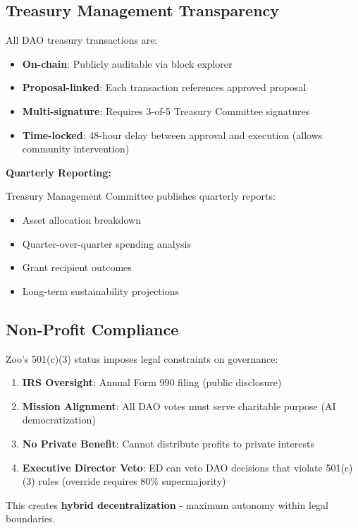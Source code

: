 \documentclass[11pt,letterpaper]{article}
\theoremstyle{definition}
\theoremstyle{remark}
\begin{document}
\subsection{Treasury Management Transparency}

All DAO treasury transactions are:
\begin{itemize}
\item \textbf{On-chain}: Publicly auditable via block explorer
\item \textbf{Proposal-linked}: Each transaction references approved proposal
\item \textbf{Multi-signature}: Requires 3-of-5 Treasury Committee signatures
\item \textbf{Time-locked}: 48-hour delay between approval and execution (allows community intervention)
\end{itemize}

\textbf{Quarterly Reporting:}

Treasury Management Committee publishes quarterly reports:
\begin{itemize}
\item Asset allocation breakdown
\item Quarter-over-quarter spending analysis
\item Grant recipient outcomes
\item Long-term sustainability projections
\end{itemize}

\subsection{Non-Profit Compliance}

Zoo's 501(c)(3) status imposes legal constraints on governance:

\begin{enumerate}
\item \textbf{IRS Oversight}: Annual Form 990 filing (public disclosure)
\item \textbf{Mission Alignment}: All DAO votes must serve charitable purpose (AI democratization)
\item \textbf{No Private Benefit}: Cannot distribute profits to private interests
\item \textbf{Executive Director Veto}: ED can veto DAO decisions that violate 501(c)(3) rules (override requires 80\% supermajority)
\end{enumerate}

This creates \textbf{hybrid decentralization} - maximum autonomy within legal boundaries.
\end{document}

